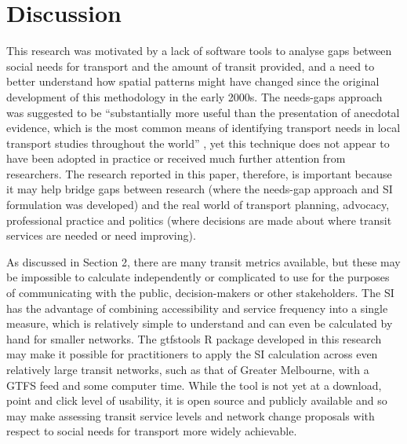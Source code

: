 \documentclass[preprint, 3p,
authoryear]{elsarticle} %
\begin{document}
\section{Discussion}\label{discussion}

This research was motivated by a lack of software tools to analyse gaps
between social needs for transport and the amount of transit provided,
and a need to better understand how spatial patterns might have changed
since the original development of this methodology in the early 2000s.
The needs-gaps approach was suggested to be ``substantially more useful
than the presentation of anecdotal evidence, which is the most common
means of identifying transport needs in local transport studies
throughout the world'' \citep{currie2010identifying}, yet this technique
does not appear to have been adopted in practice or received much
further attention from researchers. The research reported in this paper,
therefore, is important because it may help bridge gaps between research
(where the needs-gap approach and SI formulation was developed) and the
real world of transport planning, advocacy, professional practice and
politics (where decisions are made about where transit services are
needed or need improving).

As discussed in Section 2, there are many transit metrics available, but
these may be impossible to calculate independently or complicated to use
for the purposes of communicating with the public, decision-makers or
other stakeholders. The SI has the advantage of combining accessibility
and service frequency into a single measure, which is relatively simple
to understand and can even be calculated by hand for smaller networks.
The gtfstools R package developed in this research may make it possible
for practitioners to apply the SI calculation across even relatively
large transit networks, such as that of Greater Melbourne, with a GTFS
feed and some computer time. While the tool is not yet at a download,
point and click level of usability, it is open source and publicly
available and so may make assessing transit service levels and network
change proposals with respect to social needs for transport more widely
achievable.
\end{document}

